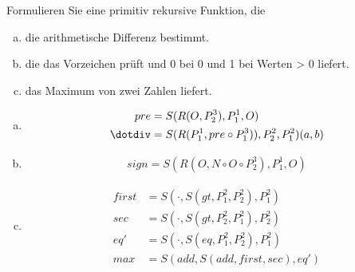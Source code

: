 \begin{card}
  Formulieren Sie eine primitiv rekursive Funktion, die
  \begin{enumerate}[a)]
    \item die arithmetische Differenz bestimmt.
    \item die das Vorzeichen prüft und 0 bei 0 und 1 bei Werten > 0 liefert.
    \item das Maximum von zwei Zahlen liefert.
	\end{enumerate}
	\hr
  \begin{enumerate}[a)]
    \item
      \begin{align*}
        pre &= S(R(O, P^3_2), P^1_1, O) \\
        \dotdiv &= S(R(P^1_1, pre \circ P^3_1)), P^2_2, P^2_1)(a, b)
      \end{align*}
    \item
       \begin{align*}
         sign = S(R(O, N \circ O \circ P^3_2), P^1_1, O)
       \end{align*}
    \item
      \begin{align*}
        first &= S(\cdot, S(gt, P^2_1, P^2_2), P^2_1) \\
        sec &= S(\cdot, S(gt, P^2_2, P^2_1), P^2_2) \\
        eq' &= S(\cdot, S(eq, P^2_1, P^2_2), P^2_1) \\
        max &= S(add, S(add, first, sec), eq')
      \end{align*}
	\end{enumerate}
\end{card}


